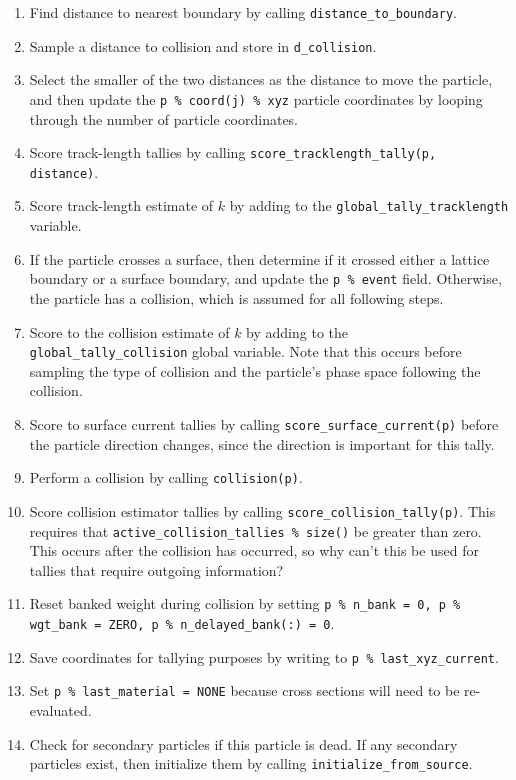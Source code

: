\documentclass[10pt]{article}
\numberwithin{equation}{section} %
\begin{document}
\begin{enumerate}
\begin{enumerate}
\begin{enumerate}
		\item Find distance to nearest boundary by calling {\tt distance\_to\_boundary}.
		\item Sample a distance to collision and store in {\tt d\_collision}. 
		\item Select the smaller of the two distances as the distance to move the particle, and then update the {\tt p \% coord(j) \% xyz} particle coordinates by looping through the number of particle coordinates.
		\item Score track-length tallies by calling {\tt score\_tracklength\_tally(p, distance)}.
		\item Score track-length estimate of \(k\) by adding to the {\tt global\_tally\_tracklength} variable.
		\item If the particle crosses a surface, then determine if it crossed either a lattice boundary or a surface boundary, and update the {\tt p \% event} field. Otherwise, the particle has a collision, which is assumed for all following steps.
		\item Score to the collision estimate of \(k\) by adding to the {\tt global\_tally\_collision} global variable. Note that this occurs before sampling the type of collision and the particle's phase space following the collision.
		\item Score to surface current tallies by calling {\tt score\_surface\_current(p)} before the particle direction changes, since the direction is important for this tally. 
		\item Perform a collision by calling {\tt collision(p)}. 
		\item Score collision estimator tallies by calling {\tt score\_collision\_tally(p)}. This requires that {\tt active\_collision\_tallies \% size()} be greater than zero. This occurs after the collision has occurred, so why can't this be used for tallies that require outgoing information?
		\item Reset banked weight during collision by setting {\tt p \% n\_bank = 0, p \% wgt\_bank = ZERO, p \% n\_delayed\_bank(:) = 0}. 
		\item Save coordinates for tallying purposes by writing to {\tt p \% last\_xyz\_current}. 
		\item Set {\tt p \% last\_material = NONE} because cross sections will need to be re-evaluated. 
		\item Check for secondary particles if this particle is dead. If any secondary particles exist, then initialize them by calling {\tt initialize\_from\_source}. 
		\end{enumerate}
	\end{enumerate}
\end{enumerate}
\end{document}
